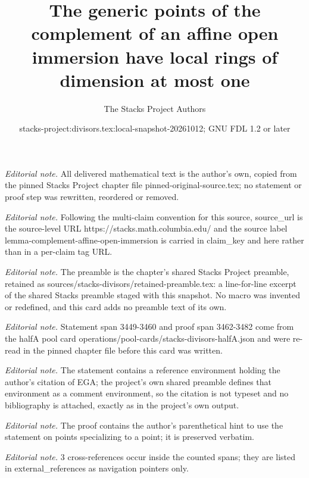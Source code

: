 \documentclass[10pt,a4paper]{amsart}
\title{The generic points of the complement of an affine open immersion have local rings of dimension at most one}
\author{The Stacks Project Authors}
\date{stacks-project:divisors.tex:local-snapshot-20261012; GNU FDL 1.2 or later}
\theoremstyle{plain}
\theoremstyle{definition}
\theoremstyle{remark}
\numberwithin{equation}{subsection}
\begin{document}
\maketitle
\noindent\textit{Editorial note.} All delivered mathematical text is the author's own, copied from the pinned Stacks Project chapter file pinned-original-source.tex; no statement or proof step was rewritten, reordered or removed.\par\medskip
\noindent\textit{Editorial note.} Following the multi-claim convention for this source, source\_url is the source-level URL https://stacks.math.columbia.edu/ and the source label lemma-complement-affine-open-immersion is carried in claim\_key and here rather than in a per-claim tag URL.\par\medskip
\noindent\textit{Editorial note.} The preamble is the chapter's shared Stacks Project preamble, retained as sources/stacks-divisors/retained-preamble.tex: a line-for-line excerpt of the shared Stacks preamble staged with this snapshot. No macro was invented or redefined, and this card adds no preamble text of its own.\par\medskip
\noindent\textit{Editorial note.} Statement span 3449-3460 and proof span 3462-3482 come from the halfA pool card operations/pool-cards/stacks-divisors-halfA.json and were re-read in the pinned chapter file before this card was written.\par\medskip
\noindent\textit{Editorial note.} The statement contains a reference environment holding the author's citation of EGA; the project's own shared preamble defines that environment as a comment environment, so the citation is not typeset and no bibliography is attached, exactly as in the project's own output.\par\medskip
\noindent\textit{Editorial note.} The proof contains the author's parenthetical hint to use the statement on points specializing to a point; it is preserved verbatim.\par\medskip
\noindent\textit{Editorial note.} 3 cross-references occur inside the counted spans; they are listed in external\_references as navigation pointers only.\par\medskip
\end{document}
